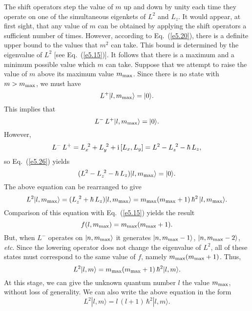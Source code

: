 The shift operators step the value of $m$ up and down by unity
each time they operate on one of the simultaneous eigenkets of 
$L^2$ and $L_z$. It would appear, at first sight, that any value of
$m$ can be obtained by applying the shift operators a sufficient
number of times. However, according to Eq.~(\ref{e5.20}), there is
a definite upper bound to the values that $m^2$ can take. This 
bound is determined by  the eigenvalue of $L^2$
[see Eq.~(\ref{e5.15})]. It follows that there is a maximum and a minimum
possible
value which  $m$ can take. 
Suppose that we attempt to raise the value
of $m$ above its maximum value $m_{\rm max}$. Since there is  no
state with $m> m_{\rm max}$, we must have
\begin{equation}
L^+ |l, m_{\rm max}\rangle = |0\rangle.
\end{equation}
This implies that 
\begin{equation}\label{e5.26}
L^-\, L^+ |l, m_{\rm max}\rangle = |0\rangle.
\end{equation}
However,
\begin{equation}
L^-\, L^+ = L_x^{~2} + L_y^{~2} + {\rm i}\,[L_x,  L_y]
= L^2 - L_z^{~2} - \hbar \,L_z,
\end{equation}
so Eq.~(\ref{e5.26}) yields
\begin{equation}
(L^2 - L_z^{~2} - \hbar \,L_z) |l, m_{\rm max}\rangle = |0\rangle.
\end{equation}
The above equation can be rearranged to give
\begin{equation}
L^2 |l, m_{\rm max}\rangle = (L_z^{~2} + \hbar \,L_z) |l, m_{\rm max}\rangle 
= m_{\rm max}(m_{\rm max} + 1) \,\hbar^2\, |l, m_{\rm max}\rangle.
\end{equation}
Comparison of this equation with Eq.~(\ref{e5.15}) yields the result
\begin{equation}
f(l, m_{\rm max}) = m_{\rm max} (m_{\rm max} + 1).
\end{equation}
But, when $L^-$ operates on $|n, m_{\rm max}\rangle$ it generates
$|n, m_{\rm max}-1\rangle$, $|n, m_{\rm max}-2\rangle$, {\em etc}. Since
the lowering operator does not change the eigenvalue of $L^2$, all of these states
must correspond to the same value of $f$, namely $m_{\rm max}(m_{\rm max} + 1)$.
Thus,
\begin{equation}
L^2 |l, m\rangle = m_{\rm max}(m_{\rm max} + 1)\,\hbar^2 |l, m\rangle.
\end{equation}
At this stage, we can give the unknown quantum number $l$ the value $m_{\rm max}$,
without loss of generality. 
We can also write the above equation in the form
\begin{equation}
L^2 |l, m\rangle = l\,(l+1)\, \hbar^2 |l, m\rangle.
\end{equation}

